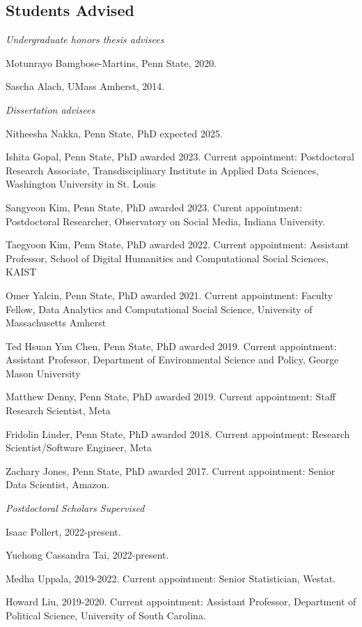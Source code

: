 \documentclass[overlapped,line]{res}
\begin{document}
\begin{resume}
\section{\bf Students Advised}
\vspace{.1cm}
\hspace{-1cm} \emph{Undergraduate honors thesis advisees}
\begin{etaremune} 
\item Motunrayo Bamgbose-Martins, Penn State, 2020.
\item Sascha Alach, UMass Amherst, 2014.
\end{etaremune}

\vspace{-.2cm}
\hspace{-1cm} \emph{Dissertation advisees}
\begin{etaremune}
\item Nitheesha Nakka, Penn State, PhD expected 2025.
\item Ishita Gopal, Penn State, PhD awarded 2023. Current appointment: Postdoctoral Research Associate, Transdisciplinary Institute in Applied Data Sciences, Washington University in St. Louis 
\item Sangyeon Kim, Penn State, PhD awarded 2023. Curent appointment:  Postdoctoral Researcher, Observatory on Social Media, Indiana University.
\item Taegyoon Kim, Penn State, PhD awarded 2022. Current appointment: Assistant Professor, School of Digital Humanities and Computational Social Sciences, KAIST
\item Omer Yalcin, Penn State, PhD awarded 2021. Current appointment: Faculty Fellow, Data Analytics and Computational Social Science, University of Massachusetts Amherst
\item Ted Hsuan Yun Chen, Penn State, PhD awarded 2019. Current appointment:  Assistant Professor, Department of Environmental Science and Policy, George Mason University
\item Matthew Denny, Penn State, PhD awarded 2019. Current appointment:  Staff Research Scientist, Meta
\item Fridolin Linder, Penn State, PhD awarded 2018. Current appointment: Research Scientist/Software Engineer, Meta
\item Zachary Jones, Penn State, PhD awarded 2017. Current appointment:  Senior Data Scientist, Amazon.

\end{etaremune}

\vspace{-.2cm}
\hspace{-1cm} \emph{Postdoctoral Scholars Supervised}
\begin{etaremune}
\item Isaac Pollert, 2022-present.
\item Yuehong Cassandra Tai, 2022-present.
\item Medha Uppala, 2019-2022. Current appointment: Senior Statistician, Westat.
\item Howard Liu, 2019-2020. Current appointment: Assistant Professor, Department of Political Science, University of South Carolina.


\end{etaremune}
\end{resume}
\end{document}
